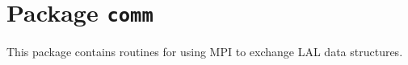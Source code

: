 \chapter{Package \texttt{comm}}

This package contains routines for using MPI to exchange LAL data structures.

\newpage
